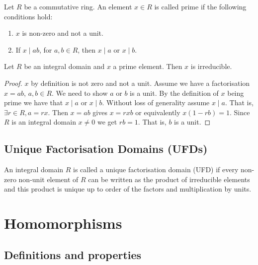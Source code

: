 \documentclass[10pt, a4paper]{article}
\begin{document}
\begin{definition}
    Let $R$ be a commutative ring.
    An element $x \in R$ is called prime if the following conditions hold:
    \begin{enumerate}[label = \roman*)]
        \item $x$ is non-zero and not a unit.

        \item If $x \mid ab$,
        for $a, b \in R$,
        then $x \mid a$ or $x \mid b$.
    \end{enumerate}
\end{definition}

\begin{lemma}
    Let $R$ be an integral domain and $x$ a prime element.
    Then $x$ is irreducible.

    \begin{proof}
        $x$ by definition is not zero and not a unit.
        Assume we have a factorisation $x = ab$,
        $a, b \in R$.
        We need to show $a$ or $b$ is a unit.
        By the definition of $x$ being prime we have that $x \mid a$ or $x \mid b$.
        Without loss of generality assume $x \mid a$.
        That is,
        $\exists r \in R, a = rx$.
        Then $x = ab$ gives $x = rxb$ or equivalently $x(1 - rb) = 1$.
        Since $R$ is an integral domain $x \neq 0$ we get $rb = 1$.
        That is,
        $b$ is a unit.
    \end{proof}
\end{lemma}

\subsection{Unique Factorisation Domains
(UFDs)}

\begin{definition}
    An integral domain $R$ is called a unique factorisation domain
    (UFD)
    if every non-zero non-unit element of $R$ can be written as the product of irreducible elements and this product is unique up to order of the factors and multiplication by units.
\end{definition}

\newpage

\section{Homomorphisms}

\subsection{Definitions and properties}
\end{document}
